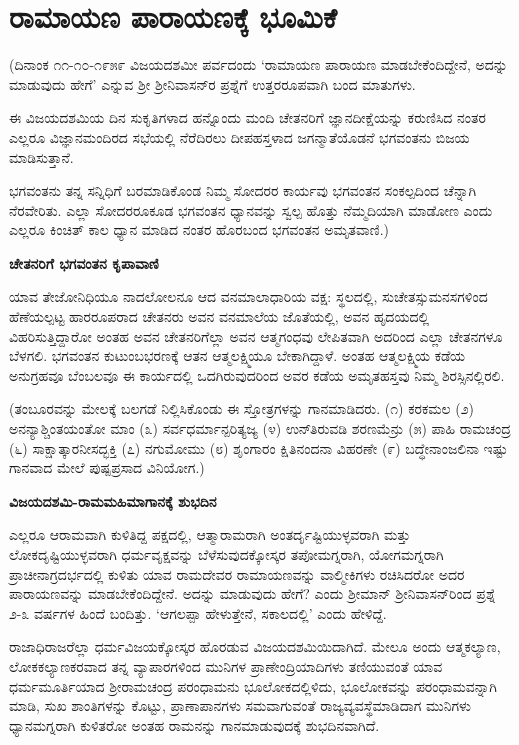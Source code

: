 \chapter{ರಾಮಾಯಣ ಪಾರಾಯಣಕ್ಕೆ ಭೂಮಿಕೆ} 


(ದಿನಾಂಕ ೧೧-೧೦-೧೯೫೯ ವಿಜಯದಶಮೀ ಪರ್ವದಂದು `ರಾಮಾಯಣ ಪಾರಾಯಣ ಮಾಡಬೇಕೆಂದಿದ್ದೇನೆ, ಅದನ್ನು ಮಾಡುವುದು ಹೇಗೆ' ಎನ್ನುವ ಶ್ರೀ ಶ್ರೀನಿವಾಸನ್‍ರ ಪ್ರಶ್ನೆಗೆ ಉತ್ತರರೂಪವಾಗಿ ಬಂದ ಮಾತುಗಳು. 


ಈ ವಿಜಯದಶಮಿಯ ದಿನ ಸುಕೃತಿಗಳಾದ ಹನ್ನೊಂದು ಮಂದಿ ಚೇತನರಿಗೆ ಜ್ಞಾನದೀಕ್ಷೆಯನ್ನು ಕರುಣಿಸಿದ ನಂತರ ಎಲ್ಲರೂ ವಿಜ್ಞಾನಮಂದಿರದ ಸಭೆಯಲ್ಲಿ ನೆರೆದಿರಲು ದೀಪಹಸ್ತಳಾದ ಜಗನ್ಮಾತೆಯೊಡನೆ ಭಗವಂತನು ಬಿಜಯ ಮಾಡಿಸುತ್ತಾನೆ. 


ಭಗವಂತನು ತನ್ನ ಸನ್ನಿಧಿಗೆ ಬರಮಾಡಿಕೊಂಡ ನಿಮ್ಮ ಸೋದರರ ಕಾರ್ಯವು ಭಗವಂತನ ಸಂಕಲ್ಪದಿಂದ ಚೆನ್ನಾಗಿ ನೆರವೇರಿತು. ಎಲ್ಲಾ ಸೋದರರೂಕೂಡ ಭಗವಂತನ ಧ್ಯಾನವನ್ನು ಸ್ವಲ್ಪ ಹೊತ್ತು ನೆಮ್ಮದಿಯಾಗಿ ಮಾಡೋಣ ಎಂದು ಎಲ್ಲರೂ ಕಿಂಚಿತ್‍ ಕಾಲ ಧ್ಯಾನ ಮಾಡಿದ ನಂತರ ಹೊರಬಂದ ಭಗವಂತನ ಅಮೃತವಾಣಿ.) 


{\bf ಚೇತನರಿಗೆ ಭಗವಂತನ ಕೃಪಾವಾಣಿ} 


ಯಾವ ತೇಜೋನಿಧಿಯೂ ನಾದಲೋಲನೂ ಆದ ವನಮಾಲಾಧಾರಿಯ ವಕ್ಷ: ಸ್ಥಲದಲ್ಲಿ, ಸುಚೇತಸ್ಸುಮನಸಗಳಿಂದ ಹೆಣೆಯಲ್ಪಟ್ಟ ಹಾರರೂಪರಾದ ಚೇತನರು ಅವನ ವನಮಾಲೆಯ ಜೊತೆಯಲ್ಲಿ, ಅವನ ಹೃದಯದಲ್ಲಿ ವಿಹರಿಸುತ್ತಿದ್ದಾರೋ ಅಂತಹ ಅವನ ಚೇತನರಿಗೆಲ್ಲಾ ಅವನ ಆತ್ಮಗಂಧವು ಲೇಪಿತವಾಗಿ ಅದರಿಂದ ಎಲ್ಲಾ ಚೇತನಗಳೂ ಬೆಳಗಲಿ. ಭಗವಂತನ ಕುಟುಂಬಭರಣಕ್ಕೆ ಆತನ ಆತ್ಮಲಕ್ಷ್ಮಿಯೂ ಬೇಕಾಗಿದ್ದಾಳೆ. ಅಂತಹ ಆತ್ಮಲಕ್ಷ್ಮಿಯ ಕಡೆಯ ಅನುಗ್ರಹವೂ ಬೆಂಬಲವೂ ಈ ಕಾರ್ಯದಲ್ಲಿ ಒದಗಿರುವುದರಿಂದ ಅವರ ಕಡೆಯ ಅಮೃತಹಸ್ತವು ನಿಮ್ಮ ಶಿರಸ್ಸಿನಲ್ಲಿರಲಿ. 


(ತಂಬೂರವನ್ನು ಮೇಲಕ್ಕೆ ಬಲಗಡೆ ನಿಲ್ಲಿಸಿಕೊಂಡು ಈ ಸ್ತೋತ್ರಗಳನ್ನು ಗಾನಮಾಡಿದರು. (೧) ಕರಕಮಲ (೨) ಅನನ್ಯಾಶ್ಚಿಂತಯಂತೋ ಮಾಂ (೩) ಸರ್ವಧರ್ಮಾನ್ಪರಿತ್ಯಜ್ಯ (೪) ಉನ್‍ತಿರುವಡಿ ಶರಣಮೆನ್ರು (೫) ಪಾಹಿ ರಾಮಚಂದ್ರ (೬) ಸಾಕ್ಷಾತ್ಕಾರನೀಸದ್ಭಕ್ತಿ (೭) ನಗುಮೋಮು (೮) ಶೃಂಗಾರಂ ಕ್ಷಿತಿನಂದನಾ ವಿಹರಣೇ (೯) ಬದ್ಧೇನಾಂಜಲಿನಾ ಇಷ್ಟು ಗಾನವಾದ ಮೇಲೆ ಪುಷ್ಪಪ್ರಸಾದ ವಿನಿಯೋಗ.) 


{\bf ವಿಜಯದಶಮಿ-ರಾಮಮಹಿಮಾಗಾನಕ್ಕೆ ಶುಭದಿನ} 


ಎಲ್ಲರೂ ಆರಾಮವಾಗಿ ಕುಳಿತಿದ್ದ ಪಕ್ಷದಲ್ಲಿ, ಆತ್ಮಾರಾಮರಾಗಿ ಅಂತರ್ದೃಷ್ಟಿಯುಳ್ಳವರಾಗಿ ಮತ್ತು ಲೋಕದೃಷ್ಟಿಯುಳ್ಳವರಾಗಿ ಧರ್ಮವೃಕ್ಷವನ್ನು ಬೆಳೆಸುವುದಕ್ಕೋಸ್ಕರ ತಪೋಮಗ್ನರಾಗಿ, ಯೋಗಮಗ್ನರಾಗಿ ಪ್ರಾಚೀನಾಗ್ರದರ್ಭದಲ್ಲಿ ಕುಳಿತು ಯಾವ ರಾಮದೇವರ ರಾಮಾಯಣವನ್ನು ವಾಲ್ಮೀಕಿಗಳು ರಚಿಸಿದರೋ ಅದರ ಪಾರಾಯಣವನ್ನು ಮಾಡಬೇಕೆಂದಿದ್ದೇನೆ. ಅದನ್ನು ಮಾಡುವುದು ಹೇಗೆ? ಎಂದು ಶ್ರೀಮಾನ್‍ ಶ್ರೀನಿವಾಸನ್‍ರಿಂದ ಪ್ರಶ್ನೆ ೨-೩ ವರ್ಷಗಳ ಹಿಂದೆ ಬಂದಿತ್ತು. `ಆಗಲಪ್ಪಾ ಹೇಳುತ್ತೇನೆ, ಸಕಾಲದಲ್ಲಿ' ಎಂದು ಹೇಳಿದ್ದೆ. 


ರಾಜಾಧಿರಾಜರೆಲ್ಲಾ ಧರ್ಮವಿಜಯಕ್ಕೋಸ್ಕರ ಹೊರಡುವ ವಿಜಯದಶಮಿಯಿದಾಗಿದೆ. ಮೇಲೂ ಅಂದು ಆತ್ಮಕಲ್ಯಾಣ, ಲೋಕಕಲ್ಯಾಣಕರವಾದ ತನ್ನ ವ್ಯಾಪಾರಗಳಿಂದ ಮುನಿಗಳ ಪ್ರಾಣೇಂದ್ರಿಯಾದಿಗಳು ತಣಿಯುವಂತೆ ಯಾವ ಧರ್ಮಮೂರ್ತಿಯಾದ ಶ್ರೀರಾಮಚಂದ್ರ ಪರಂಧಾಮನು ಭೂಲೋಕದಲ್ಲಿಳಿದು, ಭೂಲೋಕವನ್ನು ಪರಂಧಾಮವನ್ನಾಗಿ ಮಾಡಿ, ಸುಖ ಶಾಂತಿಗಳನ್ನು ಕೊಟ್ಟು, ಪ್ರಾಣಾಪಾನಗಳು ಸಮವಾಗುವಂತೆ ರಾಜ್ಯವ್ಯವಸ್ಥೆಮಾಡಿದಾಗ ಮುನಿಗಳು ಧ್ಯಾನಮಗ್ನರಾಗಿ ಕುಳಿತರೋ ಅಂತಹ ರಾಮನನ್ನು ಗಾನಮಾಡುವುದಕ್ಕೆ ಶುಭದಿನವಾಗಿದೆ. 


